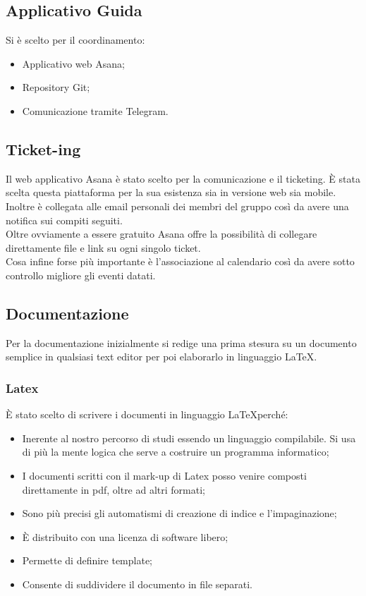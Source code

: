 \documentclass[12pt,a4paper,titlepage]{article}
\begin{document}
\subsection{Applicativo Guida}
Si è scelto per il coordinamento: 
\begin{itemize}
	\item Applicativo web Asana;
	\item Repository Git;
	\item Comunicazione tramite Telegram. 
\end{itemize}

\subsection{Ticket-ing}
Il web applicativo Asana è stato scelto per la comunicazione e il ticketing. È stata scelta questa piattaforma per la sua esistenza sia in versione web sia mobile.
Inoltre è collegata alle email personali dei membri del gruppo così da avere una notifica sui compiti seguiti.\\
Oltre ovviamente a essere gratuito Asana offre la possibilità di collegare direttamente file e link su ogni singolo ticket. \\
Cosa infine forse più importante è l'associazione al calendario così da avere sotto controllo migliore gli eventi datati.

\subsection{Documentazione}
Per la documentazione inizialmente si redige una prima stesura su un documento semplice in qualsiasi text editor per poi elaborarlo in linguaggio \LaTeX.

\subsubsection{Latex}
È stato scelto di scrivere i documenti in linguaggio \LaTeX perché:
\begin{itemize}
	\item Inerente al nostro percorso di studi essendo un linguaggio compilabile. Si usa di più la mente logica che serve a costruire un programma informatico;
	\item I documenti scritti con il mark-up di Latex posso venire composti direttamente in pdf, oltre ad altri formati;
	\item Sono più precisi gli automatismi di creazione di indice e l'impaginazione;
	\item È distribuito con una licenza di software libero;
	\item Permette di definire template;
	\item Consente di suddividere il documento in file separati.
\end{itemize} 
\end{document}
